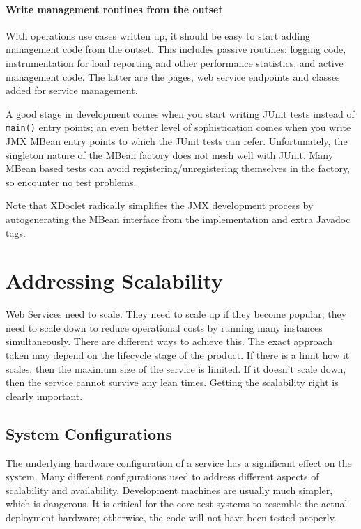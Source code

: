 \documentclass[draft]{report}
\begin{document}
\subsubsection{Write management routines from the outset}

With operations use cases written up, it should be easy to start adding
management code from the outset. This includes passive routines: logging
code, instrumentation for load reporting and other performance
statistics, and active management code. The latter are the pages, web
service endpoints and classes added for service management.

A good stage in development comes when you start writing JUnit tests
instead of \verb|main()| entry points; an even better level of
sophistication comes when you write JMX MBean entry points to which the
JUnit tests can refer. Unfortunately, the singleton nature of the MBean
factory does not mesh well with JUnit. Many MBean based tests can avoid
registering/unregistering themselves in the factory, so encounter no
test problems.

Note that XDoclet \cite{app:xdoclet} radically simplifies the JMX
development process by autogenerating the MBean interface from the
implementation and extra Javadoc tags.

\chapter{Addressing Scalability}

Web Services need to scale. They need to scale up if they become
popular; they need to scale down to reduce operational costs by running
many instances simultaneously. There are different ways to achieve this.
The exact approach taken may depend on the lifecycle stage of the
product. If there is a limit how it scales, then the maximum size of the
service is limited. If it doesn't scale down, then the service cannot
survive any lean times. Getting the scalability right is clearly
important.

\section{System Configurations}

The underlying hardware configuration of a service has a significant
effect on the system. Many different configurations used to address
different aspects of scalability and availability. Development machines
are usually much simpler, which is dangerous. It is critical for the
core test systems to resemble the actual deployment hardware; otherwise,
the code will not have been tested properly.
\end{document}
